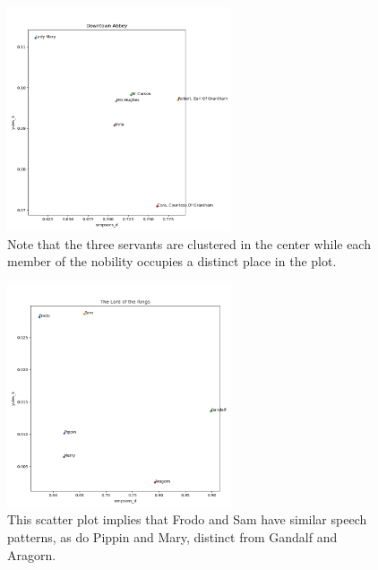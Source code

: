 \documentclass{article}
\newcommand{\mediumimagewidth}{250}
\begin{document}
\begin{titlepage}
\begin{figure}[H]
\centering
\includegraphics[width=\mediumimagewidth]{images/Downtown Abbey_heuristics.png}
\caption{Note that the three servants are clustered in the center while each member of the nobility occupies a distinct place in the plot.}
\end{figure}

\begin{figure}[H]
\centering
\includegraphics[width=\mediumimagewidth]{images/The Lord of the Rings_heuristics.png}
\caption{This scatter plot implies that Frodo and Sam have similar speech patterns, as do Pippin and Mary, distinct from Gandalf and Aragorn.}
\end{figure}


\end{titlepage}
\end{document}
